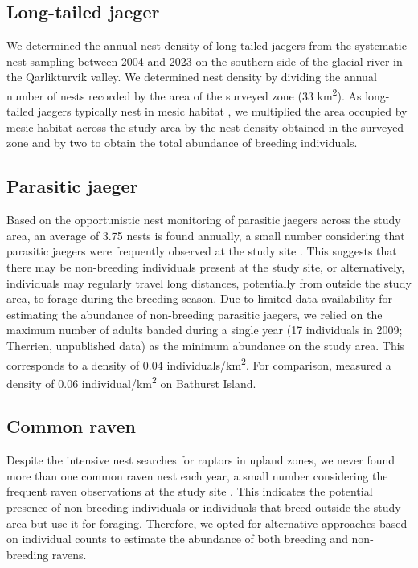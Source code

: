 \documentclass[a4paper,twoside,10pt]{article}
\begin{document}
\subsection{Long-tailed jaeger}
We determined the annual nest density of long-tailed jaegers from the systematic nest sampling between 2004 and 2023 on the southern side of the glacial river in the Qarlikturvik valley. We determined nest density by dividing the annual number of nests recorded by the area of the surveyed zone (33 km\textsuperscript{2}). As long-tailed jaegers typically nest in mesic habitat \citep{andersson1971}, we multiplied the area occupied by mesic habitat across the study area by the nest density obtained in the surveyed zone and by two to obtain the total abundance of breeding individuals. 

\subsection{Parasitic jaeger}
Based on the opportunistic nest monitoring of parasitic jaegers across the study area, an average of 3.75 nests is found annually, a small number considering that parasitic jaegers were frequently observed at the study site \citep{gauthier2024a}. This suggests that there may be non-breeding individuals present at the study site, or alternatively, individuals may regularly travel long distances, potentially from outside the study area, to forage during the breeding season. Due to limited data availability for estimating the abundance of non-breeding parasitic jaegers, we relied on the maximum number of adults banded during a single year (17 individuals in 2009; Therrien, unpublished data) as the minimum abundance on the study area. This corresponds to a density of 0.04 individuals/km\textsuperscript{2}. For comparison, \citet{taylor1974} measured a density of 0.06 individual/km\textsuperscript{2} on Bathurst Island.

\subsection{Common raven}
Despite the intensive nest searches for raptors in upland zones, we never found more than one common raven nest each year, a small number considering the frequent raven observations at the study site \citep{gauthier2024a}. This indicates the potential presence of non-breeding individuals or individuals that breed outside the study area but use it for foraging. Therefore, we opted for alternative approaches based on individual counts to estimate the abundance of both breeding and non-breeding ravens. 
\end{document}
